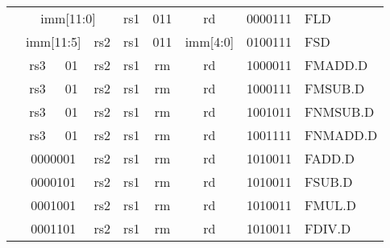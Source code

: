 \begin{table}[p]
\begin{small}
\begin{center}
\begin{tabular}{p{0in}p{0.4in}p{0.05in}p{0.05in}p{0.05in}p{0.05in}p{0.4in}p{0.6in}p{0.4in}p{0.6in}p{0.7in}l}
&
\multicolumn{6}{|c|}{imm[11:0]} &
\multicolumn{1}{c|}{rs1} &
\multicolumn{1}{c|}{011} &
\multicolumn{1}{c|}{rd} &
\multicolumn{1}{c|}{0000111} & FLD \\
\cline{2-11}
  

&
\multicolumn{4}{|c|}{imm[11:5]} &
\multicolumn{2}{c|}{rs2} &
\multicolumn{1}{c|}{rs1} &
\multicolumn{1}{c|}{011} &
\multicolumn{1}{c|}{imm[4:0]} &
\multicolumn{1}{c|}{0100111} & FSD \\
\cline{2-11}
  

&
\multicolumn{2}{|c|}{rs3} &
\multicolumn{2}{c|}{01} &
\multicolumn{2}{c|}{rs2} &
\multicolumn{1}{c|}{rs1} &
\multicolumn{1}{c|}{rm} &
\multicolumn{1}{c|}{rd} &
\multicolumn{1}{c|}{1000011} & FMADD.D \\
\cline{2-11}
  

&
\multicolumn{2}{|c|}{rs3} &
\multicolumn{2}{c|}{01} &
\multicolumn{2}{c|}{rs2} &
\multicolumn{1}{c|}{rs1} &
\multicolumn{1}{c|}{rm} &
\multicolumn{1}{c|}{rd} &
\multicolumn{1}{c|}{1000111} & FMSUB.D \\
\cline{2-11}
  

&
\multicolumn{2}{|c|}{rs3} &
\multicolumn{2}{c|}{01} &
\multicolumn{2}{c|}{rs2} &
\multicolumn{1}{c|}{rs1} &
\multicolumn{1}{c|}{rm} &
\multicolumn{1}{c|}{rd} &
\multicolumn{1}{c|}{1001011} & FNMSUB.D \\
\cline{2-11}
  

&
\multicolumn{2}{|c|}{rs3} &
\multicolumn{2}{c|}{01} &
\multicolumn{2}{c|}{rs2} &
\multicolumn{1}{c|}{rs1} &
\multicolumn{1}{c|}{rm} &
\multicolumn{1}{c|}{rd} &
\multicolumn{1}{c|}{1001111} & FNMADD.D \\
\cline{2-11}
  

&
\multicolumn{4}{|c|}{0000001} &
\multicolumn{2}{c|}{rs2} &
\multicolumn{1}{c|}{rs1} &
\multicolumn{1}{c|}{rm} &
\multicolumn{1}{c|}{rd} &
\multicolumn{1}{c|}{1010011} & FADD.D \\
\cline{2-11}
  

&
\multicolumn{4}{|c|}{0000101} &
\multicolumn{2}{c|}{rs2} &
\multicolumn{1}{c|}{rs1} &
\multicolumn{1}{c|}{rm} &
\multicolumn{1}{c|}{rd} &
\multicolumn{1}{c|}{1010011} & FSUB.D \\
\cline{2-11}
  

&
\multicolumn{4}{|c|}{0001001} &
\multicolumn{2}{c|}{rs2} &
\multicolumn{1}{c|}{rs1} &
\multicolumn{1}{c|}{rm} &
\multicolumn{1}{c|}{rd} &
\multicolumn{1}{c|}{1010011} & FMUL.D \\
\cline{2-11}
  

&
\multicolumn{4}{|c|}{0001101} &
\multicolumn{2}{c|}{rs2} &
\multicolumn{1}{c|}{rs1} &
\multicolumn{1}{c|}{rm} &
\multicolumn{1}{c|}{rd} &
\multicolumn{1}{c|}{1010011} & FDIV.D \\
\cline{2-11}
  


\end{tabular}
\end{center}
\end{small}
\end{table}
